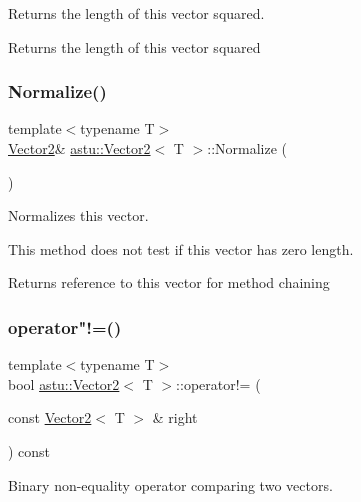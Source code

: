 Returns the length of this vector squared.

\begin{DoxyReturn}{Returns}
the length of this vector squared 
\end{DoxyReturn}
\mbox{\label{classastu_1_1Vector2_aedecfe4d0a04bb6e3b6dd94caa16e911}} 
\subsubsection{\texorpdfstring{Normalize()}{Normalize()}}
{\footnotesize\ttfamily template$<$typename T$>$ \\
\hyperlink{classastu_1_1Vector2}{Vector2}\& \hyperlink{classastu_1_1Vector2}{astu\+::\+Vector2}$<$ T $>$\+::Normalize (\begin{DoxyParamCaption}{ }\end{DoxyParamCaption})\hspace{0.3cm}{\ttfamily [inline]}}

Normalizes this vector.

This method does not test if this vector has zero length.

\begin{DoxyReturn}{Returns}
reference to this vector for method chaining 
\end{DoxyReturn}
\mbox{\label{classastu_1_1Vector2_a01b57021e1b027997ecefb3c9b3595d9}} 
\subsubsection{\texorpdfstring{operator"!=()}{operator!=()}}
{\footnotesize\ttfamily template$<$typename T$>$ \\
bool \hyperlink{classastu_1_1Vector2}{astu\+::\+Vector2}$<$ T $>$\+::operator!= (\begin{DoxyParamCaption}\item[{const \hyperlink{classastu_1_1Vector2}{Vector2}$<$ T $>$ \&}]{right }\end{DoxyParamCaption}) const\hspace{0.3cm}{\ttfamily [inline]}}

Binary non-\/equality operator comparing two vectors.


